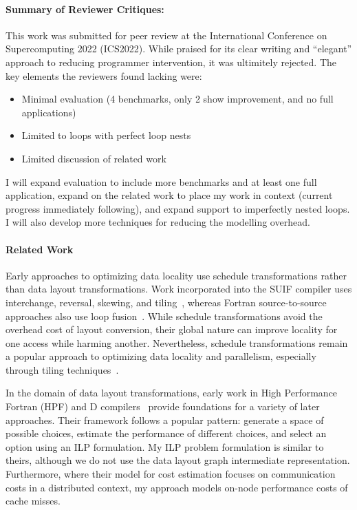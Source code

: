 \documentclass{article}
\begin{document}
\paragraph{Summary of Reviewer Critiques:}

This work was submitted for peer review at the International Conference on Supercomputing 2022 (ICS2022). 
While praised for its clear writing and \enquote{elegant} approach to reducing programmer intervention, it was ultimitely rejected.
The key elements the reviewers found lacking were:
\begin{itemize}
\item Minimal evaluation (4 benchmarks, only 2 show improvement, and no full applications)
\item Limited to loops with perfect loop nests
\item Limited discussion of related work
\end{itemize}
I will expand evaluation to include more benchmarks and at least one full application, expand on the related work to place my work in context (current progress immediately following), and expand support to imperfectly nested loops. I will also develop more techniques for reducing the modelling overhead.

\paragraph{Related Work}
Early approaches to optimizing data locality use schedule transformations rather than data layout transformations. 
Work incorporated into the SUIF compiler uses interchange, reversal, skewing, and tiling~\cite{wolf1991data}, whereas Fortran source-to-source approaches also use loop fusion~\cite{mckinley1996improving}.
While schedule transformations avoid the overhead cost of layout conversion, their global nature can improve locality for one access while harming another.
Nevertheless, schedule transformations remain a popular approach to optimizing data locality and parallelism, 
especially through tiling techniques~\cite{bondhugula2008pluto,bertolacci2015parameterized,bondhugula2016diamond,bandishti2012tiling,unat2016tida}.

In the domain of data layout transformations, early work in High Performance Fortran (HPF) and D compilers~\cite{bixby1994automatic,kennedy1995automatic,kennedy1998automatic} provide foundations for a variety of later approaches.
Their framework follows a popular pattern: generate a space of possible choices, estimate the performance of different choices, and select an option using an ILP formulation. 
My ILP problem formulation is similar to theirs, although we do not use the data layout graph intermediate representation.
Furthermore, where their model for cost estimation focuses on communication costs in a distributed context, my approach models on-node performance costs of cache misses.
\end{document}
